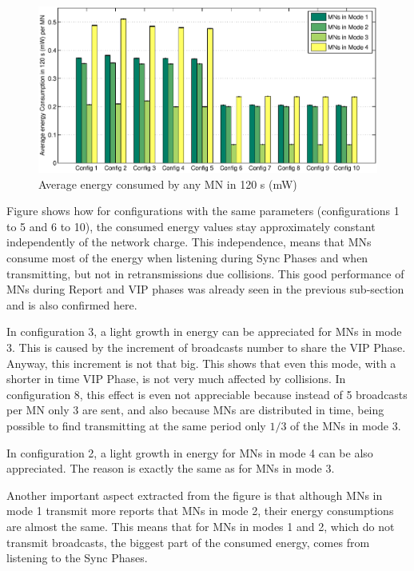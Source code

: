 \begin{figure}[ht]
 \begin{center}
  \includegraphics[width=1\textwidth]{energyConsumptionPerMN.eps}
 \end{center}
 \caption{Average energy consumed by any \ac{MN} in 120 s (mW)}
 \label{fig:energyConsumptionPerMN}
\end{figure}

Figure shows how for configurations with the same parameters (configurations 1 to 5 and 6 to 10), the consumed energy values stay approximately
constant independently of the network charge. This independence, means that \acp{MN} consume most of the energy when listening during Sync Phases and 
when transmitting, but not in retransmissions due collisions. This good performance of \acp{MN} during Report and \ac{VIP} phases was already seen
in the previous sub-section and is also confirmed here. 

In configuration 3, a light growth in energy can be appreciated for \acp{MN} in mode 3. This is caused by the increment of broadcasts number to share the 
\ac{VIP} Phase. Anyway, this increment is not that big. This shows that even this mode, with a shorter in time \ac{VIP} Phase, is not very much affected
by collisions. In configuration 8, this effect is even not appreciable because instead of 5 broadcasts per \ac{MN} only 3 are sent, and also because
\acp{MN} are distributed in time, being possible to find transmitting at the same period only $1/3$ of the \acp{MN} in mode 3.

In configuration 2, a light growth in energy for \acp{MN} in mode 4 can be also appreciated. The reason is exactly the same as for \acp{MN} in mode 3.

Another important aspect extracted from the figure is that although \acp{MN} in mode 1 transmit more reports that \acp{MN} in mode 2, their energy
consumptions are almost the same. This means that for \acp{MN} in modes 1 and 2, which do not transmit broadcasts, the biggest part of the consumed energy,
comes from listening to the Sync Phases.

